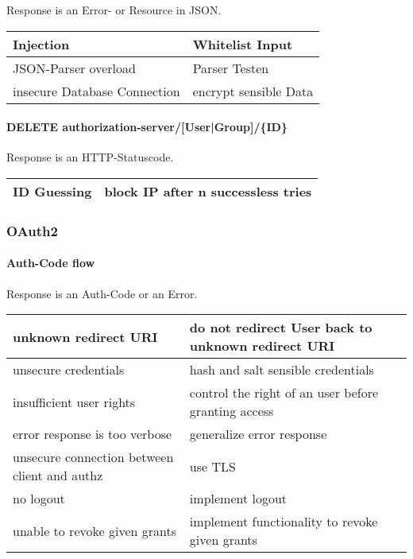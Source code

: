 Response is an Error- or Resource in JSON.

 
\begin{tabular}{|l|l|}
    \hline
    Injection & Whitelist Input\\
    \hline
    JSON-Parser overload & Parser Testen \\
    \hline
    insecure Database Connection & encrypt sensible Data \\
    \hline
 \end{tabular}

\paragraph{DELETE authorization-server/[User|Group]/\{ID\}}

Response is an HTTP-Statuscode.

\begin{tabular}{|l|l|}
   \hline
    ID Guessing & block IP after n successless tries\\
    \hline
 \end{tabular}

\subsubsection{OAuth2}

\paragraph{Auth-Code flow}

Response is an Auth-Code or an Error.

\begin{tabular}{|l|l|}
    \hline
    unknown redirect URI & do not redirect User back to unknown redirect URI\\
    \hline
    unsecure credentials & hash and salt sensible credentials \\
    \hline
    insufficient user rights & control the right of an user before granting access \\
    \hline
    error response is too verbose & generalize error response \\
    \hline
    unsecure connection between client and authz & use TLS \\
    \hline
    no logout & implement logout \\
    \hline
    unable to revoke given grants & implement functionality to revoke given grants \\
    \hline
 \end{tabular}

